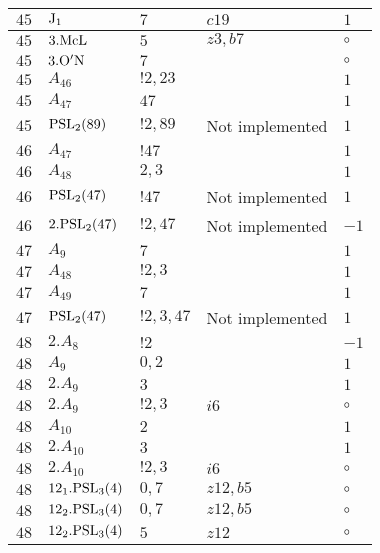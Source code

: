 \documentclass[a4paper, 11pt]{article}
\begin{document}
\begin{longtable}{lllll}
        $ 45 $ & $ {\rm J}_1 $ & $ 7 $ & $ c19 $ & $ 1$ \\ \hline
        $ 45 $ & $ 3.{\rm McL} $ & $ 5 $ & $ z3, b7 $ &  $\circ$ \\ \hline
        $ 45 $ & $ 3.{\rm {\rm O'N}} $ & $ 7 $ & $ ~ $ &  $\circ$ \\ \hline
        $ 45 $ & $ A_{46} $ & $ !2, 23 $ & $ ~ $ & $ 1$ \\ \hline
        $ 45 $ & $ A_{47} $ & $ 47 $ & $ ~ $ & $ 1$ \\ \hline
        $ 45 $ & $ {\rm PSL}_{2}(89) $ & $ !2, 89 $ &  Not implemented & $ 1$ \\ \hline
        $ 46 $ & $ A_{47} $ & $ !47 $ & $ ~ $ & $ 1$ \\ \hline
        $ 46 $ & $ A_{48} $ & $ 2, 3 $ & $ ~ $ & $ 1$ \\ \hline
        $ 46 $ & $ {\rm PSL}_{2}(47) $ & $ !47 $ &  Not implemented & $ 1$ \\ \hline
        $ 46 $ & $ 2.{\rm PSL}_{2}(47) $ & $ !2, 47 $ &  Not implemented & $ -1$ \\ \hline
        $ 47 $ & $ A_{9} $ & $ 7 $ & $ ~ $ & $ 1$ \\ \hline
        $ 47 $ & $ A_{48} $ & $ !2, 3 $ & $ ~ $ & $ 1$ \\ \hline
        $ 47 $ & $ A_{49} $ & $ 7 $ & $ ~ $ & $ 1$ \\ \hline
        $ 47 $ & $ {\rm PSL}_{2}(47) $ & $ !2, 3, 47 $ &  Not implemented & $ 1$ \\ \hline
        $ 48 $ & $ 2.A_{8} $ & $ ! 2 $ & $ ~ $ & $ -1$ \\ \hline
        $ 48 $ & $ A_{9} $ & $ 0,2 $ & $ ~ $ & $ 1$ \\ \hline
        $ 48 $ & $ 2.A_{9} $ & $ 3 $ & $ ~ $ & $ 1$ \\ \hline
        $ 48 $ & $ 2.A_{9} $ & $ ! 2,3 $ & $ i6 $ &  $\circ$ \\ \hline
        $ 48 $ & $ A_{10} $ & $ 2 $ & $ ~ $ & $ 1$ \\ \hline
        $ 48 $ & $ 2.A_{10} $ & $ 3 $ & $ ~ $ & $ 1$ \\ \hline
        $ 48 $ & $ 2.A_{10} $ & $ ! 2,3 $ & $ i6 $ &  $\circ$ \\ \hline
        $ 48 $ & $ 12_1.{\rm PSL}_{3}(4) $ & $ 0,7 $ & $ z12,b5 $ &  $\circ$ \\ \hline
        $ 48 $ & $ 12_2.{\rm PSL}_{3}(4) $ & $ 0,7 $ & $ z12, b5 $ &  $\circ$ \\ \hline
        $ 48 $ & $ 12_2.{\rm PSL}_{3}(4) $ & $ 5 $ & $ z12 $ &  $\circ$ \\ \hline

\end{longtable}
\end{document}
